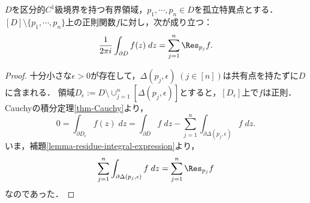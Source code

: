 \documentclass[uplatex, dvipdfmx]{jsreport}
\begin{document}
\begin{theorem}[留数定理]\label{thm-residue}
    $D$を区分的$C^1$級境界を持つ有界領域，$p_1,\cdots,p_n\in D$を孤立特異点とする．
    $[D]\setminus\{p_1,\cdots,p_n\}$上の正則関数$f$に対し，次が成り立つ：
    \[\frac{1}{2\pi i}\int_{\partial D}f(z)\;dz=\sum^n_{j=1}\Res_{p_j}f.\]
\end{theorem}
\begin{proof}
    十分小さな$\epsilon>0$が存在して，$\Delta(p_j,\epsilon)\;(j\in[n])$は共有点を持たずに$D$に含まれる．
    領域$D_\epsilon:=D\setminus\cup_{j=1}^n[\Delta(p_j,\epsilon)]$とすると，$[D_\epsilon]$上で$f$は正則．
    Cauchyの積分定理\ref{thm-Cauchy}より，
    \[0=\int_{\partial D_\epsilon}f(z)\;dz=\int_{\partial D}f\;dz-\sum^n_{j=1}\int_{\partial\Delta(p_j,\epsilon)}f\;dz.\]
    いま，補題\ref{lemma-residue-integral-expression}より，
    \[\sum^n_{j=1}\int_{\partial\Delta(p_j,\epsilon)}f\;dz=\sum^n_{j=1}\Res_{p_j}f\]
    なのであった．
\end{proof}
\end{document}
